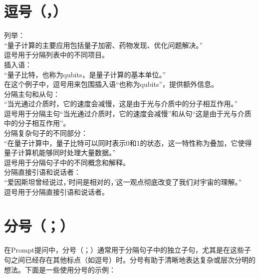 \documentclass[12pt]{book}
\begin{document}
\section{逗号（，）}
列举：\\
“量子计算的主要应用包括量子加密、药物发现、优化问题解决。”\\
逗号用于分隔列表中的不同项目。\\
插入语：\\
“量子比特，也称为qubits，是量子计算的基本单位。”\\
在这个例子中，逗号用来包围插入语“也称为qubits”，提供额外信息。\\
分隔主句和从句：\\
“当光通过介质时，它的速度会减慢，这是由于光与介质中的分子相互作用。”\\
逗号用于分隔主句“当光通过介质时，它的速度会减慢”和从句“这是由于光与介质中的分子相互作用”。\\
分隔复杂句子的不同部分：\\
“在量子计算中，量子比特可以同时表示0和1的状态，这一特性称为叠加，它使得量子计算机能够同时处理大量数据。”\\
逗号用于分隔句子中的不同概念和解释。\\
分隔直接引语和说话者：\\
“爱因斯坦曾经说过，'时间是相对的，'这一观点彻底改变了我们对宇宙的理解。”\\
逗号用于分隔直接引语和说话者。\\
\section{分号（；）}
在Prompt提问中，分号（；）通常用于分隔句子中的独立子句，尤其是在这些子句之间已经存在其他标点（如逗号）时。分号有助于清晰地表达复杂或层次分明的想法。下面是一些使用分号的示例：\\
\end{document}

